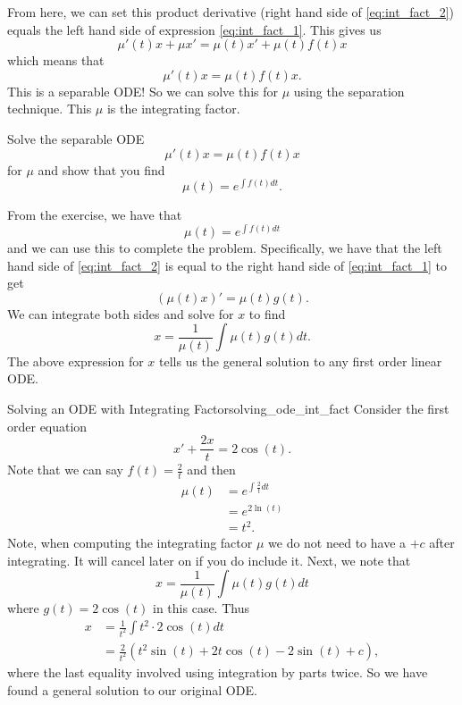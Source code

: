         From here, we can set this product derivative (right hand side of \ref{eq:int_fact_2}) equals the left hand side of expression \ref{eq:int_fact_1}.  This gives us
        \[
        \mu'(t)x+\mu x' = \mu(t)x'+\mu(t) f(t) x
        \]
        which means that
        \[
        \mu'(t)x=\mu(t) f(t) x.
        \]
        This is a separable ODE! So we can solve this for $\mu$ using the separation technique. This $\mu$ is the integrating factor.
        
        \begin{exercise}
            Solve the separable ODE
            \[
            \mu'(t)x=\mu(t)f(t)x
            \]
            for $\mu$ and show that you find
            \[
            \mu(t) = e^{\int f(t)dt}.
            \]
        \end{exercise}
        
        \noindent From the exercise, we have that
        \[
        \mu(t)=e^{\int f(t)dt}
        \]
        and we can use this to complete the problem.  Specifically, we have that the left hand side of \ref{eq:int_fact_2} is equal to the right hand side of \ref{eq:int_fact_1} to get
        \[
        (\mu(t) x)' = \mu(t)g(t).
        \]
        We can integrate both sides and solve for $x$ to find
        \[
        \boxed{x = \frac{1}{\mu(t)}\int \mu(t) g(t)dt.}
        \]
        The above expression for $x$ tells us the general solution to any first order linear ODE.
        
        \begin{ex}{Solving an ODE with Integrating Factor}{solving_ode_int_fact}
            Consider the first order equation
            \[
            x'+\frac{2x}{t}=2\cos(t).
            \]
            Note that we can say $f(t)=\frac{2}{t}$ and then 
            \begin{align*}
            \mu(t)&=e^{\int \frac{2}{t}dt}\\
            &= e^{2\ln(t)}\\
            &=t^2.
            \end{align*}
            Note, when computing the integrating factor $\mu$ we do not need to have a $+c$ after integrating. It will cancel later on if you do include it. Next, we note that
            \[
            x=\frac{1}{\mu(t)} \int \mu(t) g(t)dt
            \]
            where $g(t)=2\cos(t)$ in this case.  Thus
            \begin{align*}
                x&=\frac{1}{t^2} \int t^2 \cdot 2\cos(t)dt\\
                &=\frac{2}{t^2} \left(t^2\sin(t)+2t\cos(t)-2\sin(t)+c\right),
            \end{align*}
            where the last equality involved using integration by parts twice.  So we have found a general solution to our original ODE.
        \end{ex}
        
